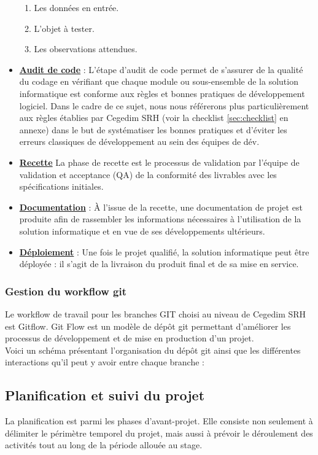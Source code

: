 \begin{itemize}
    \begin{enumerate}
        \item Les données en entrée. 
        \item L'objet à tester. 
        \item Les observations attendues.
    \end{enumerate}
    \item \textbf{\underline{Audit de code}} : L'étape d'audit de code permet de s'assurer de la qualité du codage en vérifiant que chaque module ou sous-ensemble de la solution informatique est conforme aux règles et bonnes pratiques de développement logiciel. Dans le cadre de ce sujet, nous nous référerons plus particulièrement aux règles établies par Cegedim SRH (voir la checklist \ref{sec:checklist} en annexe) dans le but de systématiser les bonnes pratiques et d'éviter les erreurs classiques de développement au sein des équipes de dév.
    \item \textbf{\underline{Recette}} La phase de recette est le processus de validation par l'équipe de validation et acceptance (QA) de la conformité des livrables avec les spécifications initiales.
    \item \textbf{\underline{Documentation}} : À l’issue de la recette, une documentation de projet est produite afin de rassembler les informations nécessaires à l’utilisation de la solution informatique et en vue de ses développements ultérieurs.
    \item \textbf{\underline{Déploiement}} : Une fois le projet qualifié, la solution informatique peut être déployée : il s’agit de la livraison du produit final et de sa mise en service.
\end{itemize}
\subsubsection{Gestion du workflow git}
Le workflow de travail pour les branches GIT choisi au niveau de Cegedim SRH est Gitflow. Git Flow est un modèle de dépôt git permettant d'améliorer les processus de développement et de mise en production d'un projet.\\
Voici un schéma présentant l'organisation du dépôt git ainsi que les différentes interactions qu'il peut y avoir entre chaque branche :
\subsection{Planification et suivi du projet}
La planification est parmi les phases d'avant-projet. Elle consiste non seulement à délimiter le périmètre temporel du projet, mais aussi à prévoir le déroulement des activités tout au long de la période allouée au stage.

